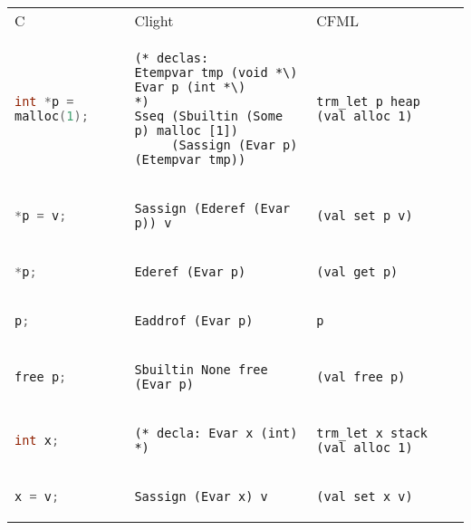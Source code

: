 \documentclass[class=scrartcl,border={0cm 1.5cm 1cm -0.5cm},multi={tabular}]{standalone}
\theoremstyle{break}
\newcommand{\clst}[1]{\lstinline[language=C]!#1!}
\begin{document}
\begin{tabular}{p{6cm}p{10cm}p{10cm}}
  \toprule
  C & Clight & CFML \\
  \clst{int *p = malloc(1);} &
\begin{lstlisting}
(* declas:
Etempvar tmp (void *\)
Evar p (int *\)
*)
Sseq (Sbuiltin (Some p) malloc [1])
     (Sassign (Evar p) (Etempvar tmp))
\end{lstlisting} &
\begin{lstlisting}
trm_let p heap (val_alloc 1)
\end{lstlisting} \\
  \clst{*p = v;}  &
\begin{lstlisting}
Sassign (Ederef (Evar p)) v
\end{lstlisting} &
\begin{lstlisting}
(val_set p v)
\end{lstlisting} \\
  \clst{*p;} &
\begin{lstlisting}
Ederef (Evar p)
\end{lstlisting} &
\begin{lstlisting}
(val_get p)
\end{lstlisting} \\
\clst{p;} &
\begin{lstlisting}
Eaddrof (Evar p)
\end{lstlisting} &
\begin{lstlisting}
p
\end{lstlisting} \\
  \clst{free p;} &
\begin{lstlisting}
Sbuiltin None free (Evar p)
\end{lstlisting} &
\begin{lstlisting}
(val_free p)
\end{lstlisting} \\
  \midrule
  \clst{int x;} &
\begin{lstlisting}
(* decla: Evar x (int) *)
\end{lstlisting} &
\begin{lstlisting}
trm_let x stack (val_alloc 1)
\end{lstlisting} \\
  \clst{x = v;} &
\begin{lstlisting}
Sassign (Evar x) v
\end{lstlisting} &
\begin{lstlisting}
(val_set x v)
\end{lstlisting} \\

\end{tabular}
\end{document}
